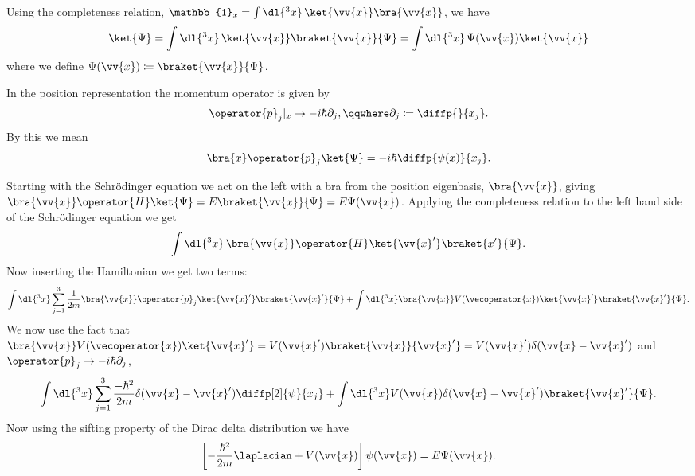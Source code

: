 \documentclass[fleqn]{NotesClass}
\newcommand*{\ident}{\mathbb{1}}
\begin{document}
    Using the completeness relation, \(\ident_x = \int \dl{^3x}\,\ket{\vv{x}}\bra{\vv{x}}\), we have
    \begin{equation}
        \ket{\Psi} = \int \dl{^3x} \, \ket{\vv{x}}\braket{\vv{x}}{\Psi} = \int \dl{^3x} \, \Psi(\vv{x})\ket{\vv{x}}
    \end{equation}
    where we define \(\Psi(\vv{x}) \coloneqq \braket{\vv{x}}{\Psi}\).
    
    In the position representation the momentum operator is given by
    \begin{equation}
        \operator{p}_j|_{x} \to -i\hbar\partial_j, \qqwhere \partial_j \coloneqq \diffp{}{x_j}.
    \end{equation}
    By this we mean
    \begin{equation}
        \bra{x}\operator{p}_j\ket{\Psi} = -i\hbar\diffp{\psi(x)}{x_j}.
    \end{equation}
    
    Starting with the Schrödinger equation we act on the left with a bra from the position eigenbasis, \(\bra{\vv{x}}\), giving \(\bra{\vv{x}}\operator{H}\ket{\Psi} = E\braket{\vv{x}}{\Psi} = E\Psi(\vv{x})\).
    Applying the completeness relation to the left hand side of the Schrödinger equation we get
    \begin{equation}
        \int \dl{^3x} \, \bra{\vv{x}} \operator{H} \ket{\vv{x}'}\braket{x'}{\Psi}.
    \end{equation}
    Now inserting the Hamiltonian we get two terms:
    \begin{equation}
        \int \dl{^3x} \sum_{j = 1}^{3} \frac{1}{2m} \bra{\vv{x}}\operator{p}_j\ket{\vv{x}'}\braket{\vv{x}'}{\Psi} + \int \dl{^3x} \bra{\vv{x}} V(\vecoperator{x}) \ket{\vv{x}'}\braket{\vv{x}'}{\Psi}.
    \end{equation}
    We now use the fact that \(\bra{\vv{x}}V(\vecoperator{x})\ket{\vv{x}'} = V(\vv{x}')\braket{\vv{x}}{\vv{x}'} = V(\vv{x}')\delta(\vv{x} - \vv{x}')\) and \(\operator{p}_j \to -i\hbar\partial_j\),
    \begin{equation}
        \int \dl{^3x} \sum_{j = 1}^{3} \frac{-\hbar^2}{2m} \delta(\vv{x} - \vv{x}') \diffp[2]{\psi}{x_j} + \int \dl{^3x} V(\vv{x})\delta(\vv{x} - \vv{x}')\braket{\vv{x}'}{\Psi}.
    \end{equation}
    Now using the sifting property of the Dirac delta distribution we have
    \begin{equation}
        \left[ -\frac{\hbar^2}{2m} \laplacian + V(\vv{x}) \right] \psi(\vv{x}) = E\Psi(\vv{x}).
    \end{equation}
\end{document}
